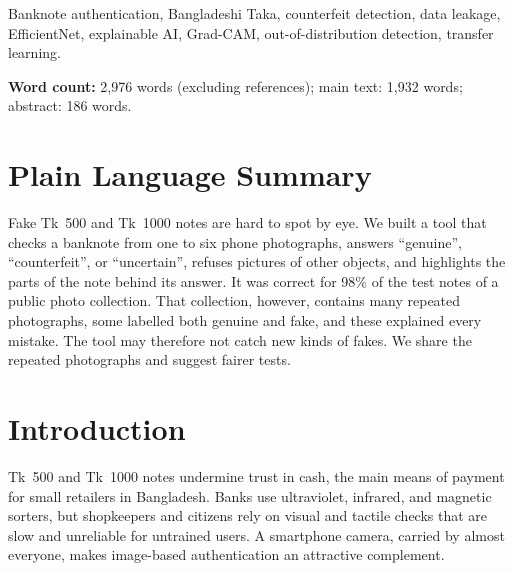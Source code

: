 \documentclass[journal]{IEEEtran}
\begin{document}
\begin{IEEEkeywords}
Banknote authentication, Bangladeshi Taka, counterfeit detection, data leakage,
EfficientNet, explainable AI, Grad-CAM, out-of-distribution detection, transfer learning.
\end{IEEEkeywords}

\noindent\textbf{Word count:} 2{,}976 words (excluding references); main text: 1{,}932
words; abstract: 186 words.

\section*{Plain Language Summary}
Fake Tk~500 and Tk~1000 notes are hard to spot by eye. We built a tool that checks a
banknote from one to six phone photographs, answers ``genuine'', ``counterfeit'', or
``uncertain'', refuses pictures of other objects, and highlights the parts of the note
behind its answer. It was correct for 98\% of the test notes of a public photo
collection. That collection, however, contains many repeated photographs, some labelled
both genuine and fake, and these explained every mistake. The tool may therefore not
catch new kinds of fakes. We share the repeated photographs and suggest fairer tests.

\section{Introduction}
\label{sec:intro}

 Tk~500 and Tk~1000 notes undermine trust in cash, the main
means of payment for small retailers in Bangladesh. Banks use ultraviolet, infrared, and
magnetic sorters, but shopkeepers and citizens rely on visual and tactile checks that are
slow and unreliable for untrained users. A smartphone camera, carried by almost
everyone, makes image-based authentication an attractive complement.
\end{document}
